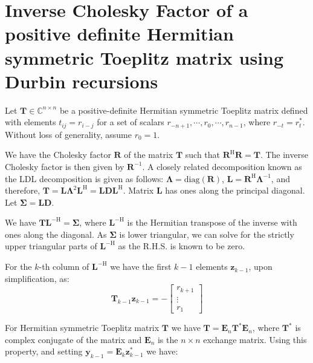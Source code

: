 \section{Inverse Cholesky Factor of a positive definite Hermitian symmetric Toeplitz matrix using Durbin recursions}

Let $\boldsymbol{T} \in \mathbb{C}^{n \times n}$ be a positive-definite Hermitian symmetric Toeplitz matrix defined with elements $t_{ij} = r_{i-j}$ for a set of scalars $r_{-n+1}, \cdots, r_0, \cdots, r_{n-1}$, where $r_{-t} = r_t^*$. Without loss of generality, assume $r_0 = 1$.

We have the Cholesky factor $\boldsymbol{R}$ of the matrix $\boldsymbol{T}$ such that $\boldsymbol{R}^{\mathrm{H}} \boldsymbol{R} = \boldsymbol{T}$. The inverse Cholesky factor is then given by $\boldsymbol{R}^{-1}$. A closely related decomposition known as the LDL decomposition is given as follows: $\boldsymbol{\Lambda} = \text{diag}(\boldsymbol{R})$, $\boldsymbol{L} = \boldsymbol{R}^{\mathrm{H}} \boldsymbol{\Lambda}^{-1}$, and therefore, $\boldsymbol{T} = \boldsymbol{L} \boldsymbol{\Lambda}^2 \boldsymbol{L}^{\mathrm{H}} = \boldsymbol{L} \boldsymbol{D} \boldsymbol{L}^{\mathrm{H}}$. Matrix $\boldsymbol{L}$ has ones along the principal diagonal. Let $\boldsymbol{\Sigma} = \boldsymbol{L}\boldsymbol{D}$.

We have $\boldsymbol{T} \boldsymbol{L}^{-\mathrm{H}} = \boldsymbol{\Sigma}$, where $\boldsymbol{L}^{-\mathrm{H}}$ is the Hermitian transpose of the inverse with ones along the diagonal. As $\boldsymbol{\Sigma}$ is lower triangular, we can solve for the strictly upper triangular parts of $\boldsymbol{L}^{-\mathrm{H}}$ as the R.H.S. is known to be zero.

For the $k$-th column of $\boldsymbol{L}^{-\mathrm{H}}$ we have the first $k-1$ elements $\boldsymbol{z}_{k-1}$, upon simplification, as:
$$\boldsymbol{T}_{k-1} \boldsymbol{z}_{k-1} = - \begin{bmatrix} r_{k+1} \\ \vdots \\ r_1 \end{bmatrix}$$

For Hermitian symmetric Toeplitz matrix $\boldsymbol{T}$ we have $\boldsymbol{T} = \boldsymbol{E}_n \boldsymbol{T}^* \boldsymbol{E}_n$, where $\boldsymbol{T}^*$ is complex conjugate of the matrix and $\boldsymbol{E}_n$ is the $n \times n$ exchange matrix. Using this property, and setting $\boldsymbol{y}_{k-1} = \boldsymbol{E}_k \boldsymbol{z}^*_{k-1}$ we have:

